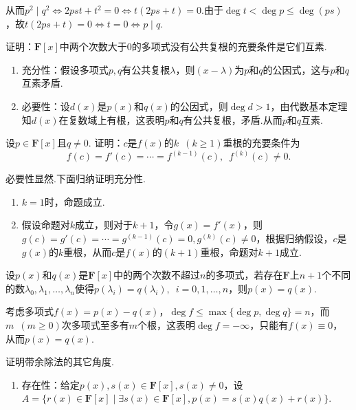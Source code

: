 \begin{exercise}
\begin{exgroup}
\begin{answer}
            从而$p^2\mid q^2\iff 2pst+t^2=0 \iff t(2ps+t)=0$.由于$\deg t<\deg p\leqslant \deg (ps)$，故$t(2ps+t)=0\iff t=0 \iff p\mid q$.
        \end{answer}
        \item 证明：$\mathbf{F}[x]$中两个次数大于0的多项式没有公共复根的充要条件是它们互素.
        \begin{answer}
            \begin{enumerate}
                \item 充分性：假设多项式$p,q$有公共复根$\lambda$，则$(x-\lambda)$为$p$和$q$的公因式，这与$p$和$q$互素矛盾.
                \item 必要性：设$d(x)$是$p(x)$和$q(x)$的公因式，则$\deg d>1$，由代数基本定理知$d(x)$在复数域上有根，这表明$p$和$q$有公共复根，矛盾.从而$p$和$q$互素.
            \end{enumerate}
        \end{answer}
        \item 设$p\in\mathbf{F}[x]$且$q\neq 0$. 证明：$c$是$f(x)$的$k\enspace(k\geqslant 1)$重根的充要条件为
        \[f(c)=f'(c)=\cdots=f^{(k-1)}(c),\enspace f^{(k)}(c)\neq 0.\]
        \begin{answer}
            必要性显然.下面归纳证明充分性.
            \begin{enumerate}
                \item $k=1$时，命题成立.
                \item 假设命题对$k$成立，则对于$k+1$，令$g(x)=f'(x)$，则$g(c)=g'(c)=\cdots=g^{(k-1)}(c)=0,g^{(k)}(c)\neq 0$，根据归纳假设，$c$是$g(x)$的$k$重根，从而$c$是$f(x)$的$(k+1)$重根，命题对$k+1$成立.
            \end{enumerate}
        \end{answer}
        \item 设$p(x)$和$q(x)$是$\mathbf{F}[x]$中的两个次数不超过$n$的多项式，若存在$\mathbf{F}$上$n+1$个不同的数$\lambda_0,\lambda_1,\ldots,\lambda_n$使得$p(\lambda_i)=q(\lambda_i),\enspace i=0,1,\ldots,n$，则$p(x)=q(x)$.
        \begin{answer}
            考虑多项式$f(x)=p(x)-q(x)$，$\deg f\leqslant \max\{\deg p,\deg q\}=n$，而$m\enspace(m\geqslant 0)$次多项式至多有$m$个根，这表明$\deg f=-\infty$，只能有$f(x)\equiv 0$，从而$p(x)=q(x)$.
        \end{answer}
    \end{exgroup}

    \begin{exgroup}
        \item 证明带余除法的其它角度.
        \begin{answer}
            \begin{enumerate}
                \item 存在性：给定$p(x),s(x)\in\mathbf{F}[x],s(x)\neq 0$，设$A=\{r(x)\in \mathbf{F}[x]\mid\exists s(x)\in \mathbf{F}[x],p(x)=s(x)q(x)+r(x)\}$.


\end{enumerate}
\end{answer}
\end{exgroup}
\end{exercise}
